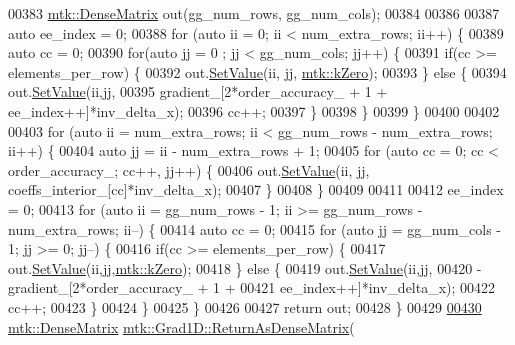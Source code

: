 \begin{DoxyCode}
{{00383   \hyperlink{classmtk_1_1DenseMatrix}{mtk::DenseMatrix} out(gg\_num\_rows, gg\_num\_cols);
00384 
00386 
00387   \textcolor{keyword}{auto} ee\_index = 0;
00388   \textcolor{keywordflow}{for} (\textcolor{keyword}{auto} ii = 0; ii < num\_extra\_rows; ii++) \{
00389     \textcolor{keyword}{auto} cc = 0;
00390     \textcolor{keywordflow}{for}(\textcolor{keyword}{auto} jj = 0 ; jj < gg\_num\_cols; jj++) \{
00391       \textcolor{keywordflow}{if}(cc >= elements\_per\_row) \{
00392         out.\hyperlink{classmtk_1_1DenseMatrix_a784ce5784109ac86bfb9d8562b334b13}{SetValue}(ii, jj, \hyperlink{group__c01-roots_ga59a451a5fae30d59649bcda274fea271}{mtk::kZero});
00393       \} \textcolor{keywordflow}{else} \{
00394         out.\hyperlink{classmtk_1_1DenseMatrix_a784ce5784109ac86bfb9d8562b334b13}{SetValue}(ii,jj,
00395                      gradient\_[2*order\_accuracy\_ + 1 + ee\_index++]*inv\_delta\_x);
00396         cc++;
00397       \}
00398     \}
00399   \}
00400 
00402 
00403   \textcolor{keywordflow}{for} (\textcolor{keyword}{auto} ii = num\_extra\_rows; ii < gg\_num\_rows - num\_extra\_rows; ii++) \{
00404     \textcolor{keyword}{auto} jj = ii - num\_extra\_rows + 1;
00405     \textcolor{keywordflow}{for} (\textcolor{keyword}{auto} cc = 0; cc < order\_accuracy\_; cc++, jj++) \{
00406       out.\hyperlink{classmtk_1_1DenseMatrix_a784ce5784109ac86bfb9d8562b334b13}{SetValue}(ii, jj, coeffs\_interior\_[cc]*inv\_delta\_x);
00407     \}
00408   \}
00409 
00411 
00412   ee\_index = 0;
00413   \textcolor{keywordflow}{for} (\textcolor{keyword}{auto} ii = gg\_num\_rows - 1; ii >= gg\_num\_rows - num\_extra\_rows; ii--) \{
00414     \textcolor{keyword}{auto} cc = 0;
00415     \textcolor{keywordflow}{for} (\textcolor{keyword}{auto} jj = gg\_num\_cols - 1; jj >= 0; jj--) \{
00416       \textcolor{keywordflow}{if}(cc >= elements\_per\_row) \{
00417         out.\hyperlink{classmtk_1_1DenseMatrix_a784ce5784109ac86bfb9d8562b334b13}{SetValue}(ii,jj,\hyperlink{group__c01-roots_ga59a451a5fae30d59649bcda274fea271}{mtk::kZero});
00418       \} \textcolor{keywordflow}{else} \{
00419         out.\hyperlink{classmtk_1_1DenseMatrix_a784ce5784109ac86bfb9d8562b334b13}{SetValue}(ii,jj,
00420                      -gradient\_[2*order\_accuracy\_ + 1 +
00421 ee\_index++]*inv\_delta\_x);
00422         cc++;
00423       \}
00424      \}
00425   \}
00426 
00427   \textcolor{keywordflow}{return} out;
00428 \}
00429 
\hypertarget{mtk__grad__1d_8cc_source_l00430}{}\hyperlink{classmtk_1_1Grad1D_a871a3b31e257b04d5e303b3211df3a73}{00430} \hyperlink{classmtk_1_1DenseMatrix}{mtk::DenseMatrix} \hyperlink{classmtk_1_1Grad1D_a77b2eddbe4ab03f469306c604d505b1a}{mtk::Grad1D::ReturnAsDenseMatrix}(
}}
\end{DoxyCode}
